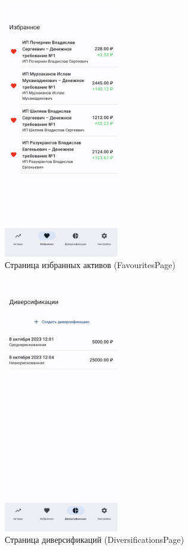 \documentclass[a4paper, 14pt]{article}
\begin{document}
\begin{figure}[H]
    \centering
    \includegraphics[width=5cm]{resources/9.png}
    \caption{Страница избранных активов (FavouritesPage)}
\end{figure}

\begin{figure}[H]
    \centering
    \includegraphics[width=5cm]{resources/10.png}
    \caption{Страница диверсификаций (DiversificationsPage)}
\end{figure}
\end{document}
